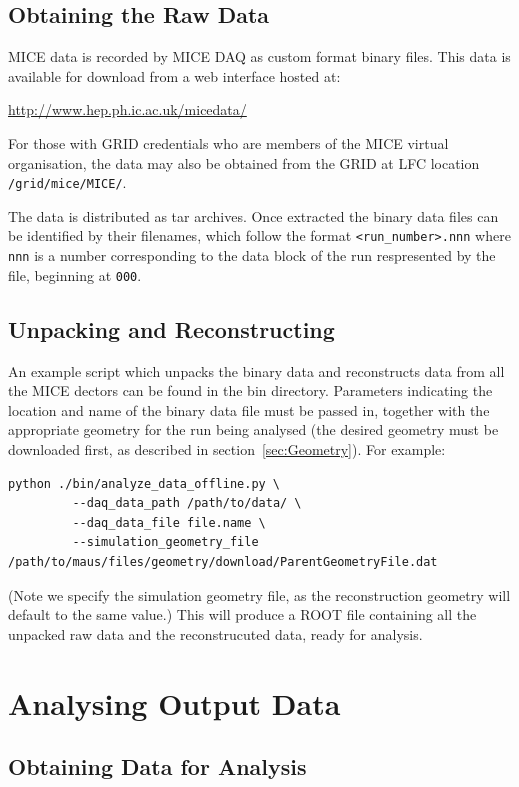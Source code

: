 \documentclass[a4paper,10pt]{article}
\begin{document}
  \subsection{Obtaining the Raw Data}
    MICE data is recorded by MICE DAQ as custom format binary files.  This data is available for download from a web interface hosted at:

    \medskip
    \url{http://www.hep.ph.ic.ac.uk/micedata/}
    \medskip

    For those with GRID credentials who are members of the MICE virtual organisation, the data may also be obtained from the GRID at LFC location \texttt{/grid/mice/MICE/}.

    The data is distributed as tar archives. Once extracted the binary data files can be identified by their filenames, which follow the format \texttt{<run\_number>.nnn} where \texttt{nnn} is a number corresponding to the data block of the run respresented by the file, beginning at \texttt{000}.

  \subsection{Unpacking and Reconstructing}
    An example script which unpacks the binary data and reconstructs data from all the MICE dectors can be found in the bin directory.  Parameters indicating the location and name of the binary data file must be passed in, together with the appropriate geometry for the run being analysed (the desired geometry must be downloaded first, as described in section~\ref{sec:Geometry}).  For example:
    \begin{lstlisting}
python ./bin/analyze_data_offline.py \
         --daq_data_path /path/to/data/ \
         --daq_data_file file.name \
         --simulation_geometry_file /path/to/maus/files/geometry/download/ParentGeometryFile.dat
    \end{lstlisting}
    (Note we specify the simulation geometry file, as the reconstruction geometry will default to the same value.) This will produce a ROOT file containing all the unpacked raw data and the reconstrucuted data, ready for analysis.

\section{Analysing Output Data}
\label{sec:Analysis}

  \subsection{Obtaining Data for Analysis}
\end{document}
